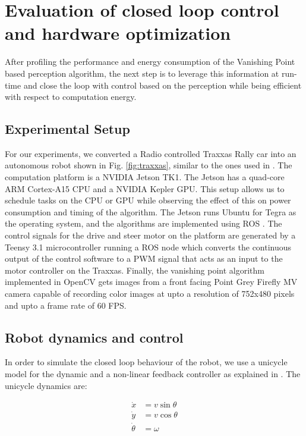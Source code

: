 \section{Evaluation of closed loop control and hardware optimization}
\label{sec:evaluation}
After profiling the performance and energy consumption of the Vanishing Point based perception algorithm, the next step is to leverage this information at run-time and close the loop with control based on the perception while being efficient with respect to computation energy.

\subsection{Experimental Setup}

For our experiments, we converted a Radio controlled Traxxas Rally car into an autonomous robot shown in Fig. \ref{fig:traxxas}, similar to the ones used in \cite{racecar_mit}. The computation platform is a NVIDIA Jetson TK1. The Jetson has a quad-core ARM Cortex-A15 CPU and a NVIDIA Kepler GPU. 
This setup allows us to schedule tasks on the CPU or GPU while observing the effect of this on power consumption and timing of the algorithm. 
The Jetson runs Ubuntu for Tegra as the operating system, and the algorithms are implemented using ROS \cite{ros}. The control signals for the drive and steer motor on the platform are generated by a Teensy 3.1 microcontroller running a ROS node which converts the continuous output of the control software to a PWM signal that acts as an input to the motor controller on the Traxxas. Finally, the vanishing point algorithm implemented in OpenCV \cite{opencv} gets images from a front facing Point Grey Firefly MV camera capable of recording color images at upto a resolution of 752x480 pixels and upto a frame rate of 60 FPS. 



\subsection{Robot dynamics and control}
\label{sec:robotDynamics}
In order to simulate the closed loop behaviour of the robot, we use a unicycle model for the dynamic and a non-linear feedback controller as explained in \cite{VP2}. The unicycle dynamics are:

\begin{subequations}
\begin{align}
\dot{x} &= v\sin\theta \nonumber \\
\dot{y} &= v\cos\theta \nonumber \\
\dot{\theta} &= \omega 
\end{align}
\label{eq:plant}
\end{subequations}

